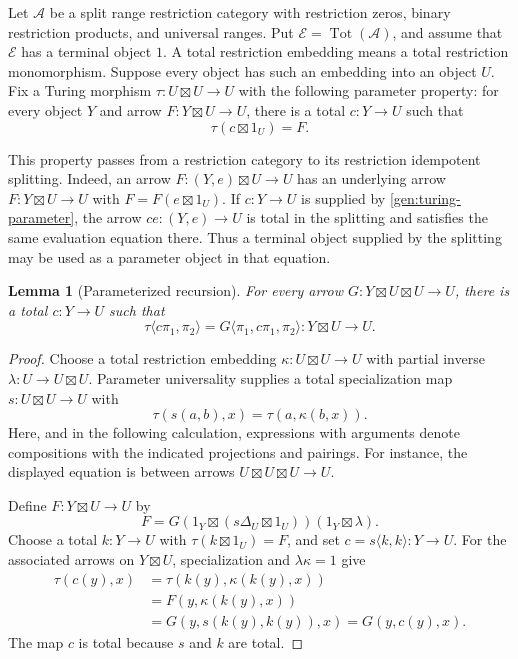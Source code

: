 \documentclass[11pt]{article}
\newtheorem{lemma}[theorem]{Lemma}
\theoremstyle{definition}
\theoremstyle{remark}
\newcommand{\Tot}{\operatorname{Tot}}
\begin{document}
Let $\mathscr A$ be a split range restriction category with restriction
zeros, binary restriction products, and universal ranges. Put
$\mathscr E=\Tot(\mathscr A)$, and assume that $\mathscr E$ has a
terminal object $1$. A total restriction embedding means a total
restriction monomorphism. Suppose every object has such an embedding
into an object $U$. Fix a Turing morphism
$\tau:U\boxtimes U\to U$ with the following parameter property:
for every object $Y$ and arrow $F:Y\boxtimes U\to U$, there is a
total $c:Y\to U$ such that
\begin{equation}\label{gen:turing-parameter}
 \tau(c\boxtimes1_U)=F.
\end{equation}

This property passes from a restriction category to its restriction
idempotent splitting. Indeed, an arrow
$F:(Y,e)\boxtimes U\to U$ has an underlying arrow
$F:Y\boxtimes U\to U$ with $F=F(e\boxtimes1_U)$.
If $c:Y\to U$ is supplied by \eqref{gen:turing-parameter}, the arrow
$ce:(Y,e)\to U$ is total in the splitting and satisfies the same
evaluation equation there. Thus a terminal object supplied by the
splitting may be used as a parameter object in that equation.

\begin{lemma}[Parameterized recursion]\label{gen:recursion}
For every arrow $G:Y\boxtimes U\boxtimes U\to U$, there is a total
$c:Y\to U$ such that
\[
 \tau\langle c\pi_1,\pi_2\rangle
 =G\langle\pi_1,c\pi_1,\pi_2\rangle:
 Y\boxtimes U\longrightarrow U.
\]
\end{lemma}
\begin{proof}
Choose a total restriction embedding
$\kappa:U\boxtimes U\to U$ with partial inverse
$\lambda:U\to U\boxtimes U$. Parameter universality supplies a
total specialization map $s:U\boxtimes U\to U$ with
\[
 \tau(s(a,b),x)=\tau(a,\kappa(b,x)).
\]
Here, and in the following calculation, expressions with arguments
denote compositions with the indicated projections and pairings.
For instance, the displayed equation is between arrows
$U\boxtimes U\boxtimes U\to U$.

Define $F:Y\boxtimes U\to U$ by
\[
 F=G(1_Y\boxtimes(s\Delta_U\boxtimes1_U))
       (1_Y\boxtimes\lambda).
\]
Choose a total $k:Y\to U$ with $\tau(k\boxtimes1_U)=F$, and set
$c=s\langle k,k\rangle:Y\to U$. For the associated arrows on
$Y\boxtimes U$, specialization and $\lambda\kappa=1$ give
\begin{align*}
 \tau(c(y),x)
 &=\tau(k(y),\kappa(k(y),x))\\
 &=F(y,\kappa(k(y),x))\\
 &=G(y,s(k(y),k(y)),x)=G(y,c(y),x).
\end{align*}
The map $c$ is total because $s$ and $k$ are total.
\end{proof}
\end{document}
